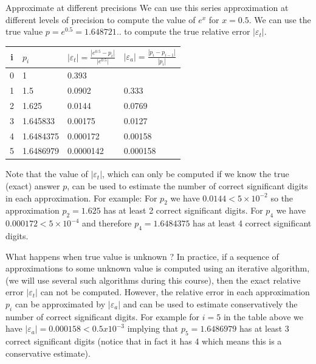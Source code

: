 \documentclass[12pt]{beamer}
\begin{document}
\begin{frame}{Approximate at different precisions}
We can use this series approximation at different levels of precision 
to compute the value of $e^x$ for $x = 0.5$. We can use the true value 
$p = e^{0.5} = 1.648721 ..$ to compute the true relative error
$|\varepsilon_{t}|$. 


\begin{table} 
\begin{tabular}{|c|l|l|l|} 
\hline 
i & $p_{i}$ & $|\varepsilon_{t}| = \frac{|e^{0.5} - p_{i}|}{|e^{0.5}|}$ &
$|\varepsilon_{a}| = \frac{|p_{i} - p_{i-1}|}{|p_{i}|}$ \\
\hline 
0 & 1 & 0.393 & \\ 
1 & 1.5 & 0.0902 & 0.333 \\ 
2 & 1.625 & 0.0144 & 0.0769 \\ 
3 & 1.645833 & 0.00175 & 0.0127 \\ 
4 & 1.6484375 & 0.000172 & 0.00158 \\ 
5 & 1.6486979 & 0.0000142 & 0.000158 \\ 
\hline 


\end{tabular} 
\end{table} 

\end{frame}


\begin{frame} 
Note that the value of $|\varepsilon_t|$, which can only be computed if
we know the true (exact) answer $p$, can be used to estimate the
number of correct significant digits in each approximation. For
example: For $p_{2}$ we have $0.0144 < 5 \times 10^{-2}$ so the 
approximation $p_{2} = 1.625$ has at least 2 correct significant digits. For
$p_{4}$ we have $0.000172 < 5 \times 10^{-4}$ and therefore 
$p_{4} = 1.6484375$ has at least 4 correct significant digits. 
\end{frame}


\begin{frame}{What happens when true value is unknown ?} 
In practice, if a sequence of approximations to some unknown value 
is computed using an iterative algorithm, (we will use several such
algorithms during this course), then the exact relative error
$|\varepsilon_{t}|$ can not be computed. However, the relative error in
each approximation $p_i$ can be approximated by
$|\varepsilon_{a}|$ and can be used to estimate conservatively the
number of correct significant digits. For example for $i=5$ in the
table above we have $|\varepsilon_{a}| = 0.000158 < 0.5 x 10^{-3}$ 
implying that $p_{5} = 1.6486979$ has at least 3 correct significant
digits (notice that in fact it has 4 which means this is a
conservative estimate). 

\end{frame} 
\end{document}
